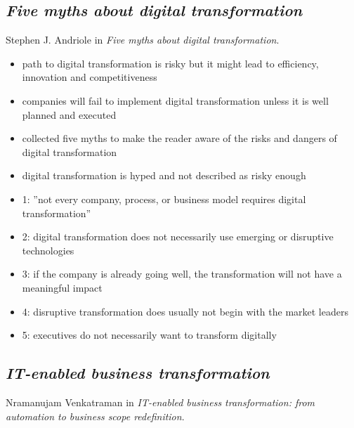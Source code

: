 \documentclass[a4]{scrartcl}
\begin{document}
\subsection{\textit{Five myths about digital transformation}} \label{5myths}	
	
	Stephen J. Andriole in \textit{Five myths about digital transformation}. \cite{5myths}
	
	\begin{itemize}
		\item path to digital transformation is risky but it might lead to efficiency, innovation and competitiveness
		\item companies will fail to implement digital transformation unless it is well planned and executed
		\item collected five myths to make the reader aware of the risks and dangers of digital transformation
		\item digital transformation is hyped and not described as risky enough
		\item 1: ''not every company, process, or business model requires digital transformation'' \cite[p. 20]{5myths}
		\item 2: digital transformation does not necessarily use emerging or disruptive technologies
		\item 3: if the company is already going well, the transformation will not have a meaningful impact
		\item 4: disruptive transformation does usually not begin with the market leaders
		\item 5: executives do not necessarily want to transform digitally 
	\end{itemize}










\subsection{\textit{IT-enabled business transformation}} \label{venkat}	

Nramanujam Venkatraman in \textit{IT-enabled business transformation: from automation to business scope redefinition}. \cite{venkat}
\end{document}
